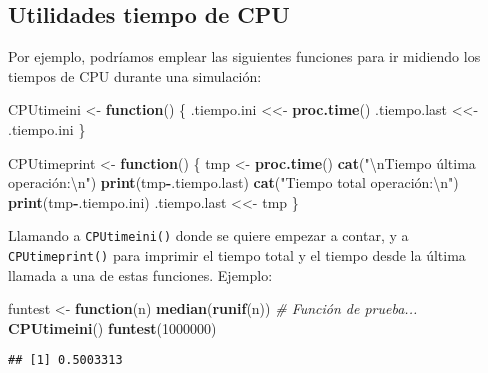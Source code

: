 \documentclass[
]{book}
\newenvironment{Shaded}{\begin{snugshade}}{\end{snugshade}}
\newcommand{\CharTok}[1]{\textcolor[rgb]{0.31,0.60,0.02}{#1}}
\newcommand{\CommentTok}[1]{\textcolor[rgb]{0.56,0.35,0.01}{\textit{#1}}}
\newcommand{\ControlFlowTok}[1]{\textcolor[rgb]{0.13,0.29,0.53}{\textbf{#1}}}
\newcommand{\DecValTok}[1]{\textcolor[rgb]{0.00,0.00,0.81}{#1}}
\newcommand{\KeywordTok}[1]{\textcolor[rgb]{0.13,0.29,0.53}{\textbf{#1}}}
\newcommand{\NormalTok}[1]{#1}
\newcommand{\OperatorTok}[1]{\textcolor[rgb]{0.81,0.36,0.00}{\textbf{#1}}}
\newcommand{\StringTok}[1]{\textcolor[rgb]{0.31,0.60,0.02}{#1}}
\theoremstyle{break}
\theoremstyle{definition}
\theoremstyle{definition}
\theoremstyle{definition}
\theoremstyle{remark}
\begin{document}
\hypertarget{utilidades-tiempo-de-cpu}{%
\subsection{Utilidades tiempo de CPU}\label{utilidades-tiempo-de-cpu}}

Por ejemplo, podríamos emplear las siguientes funciones para
ir midiendo los tiempos de CPU durante una simulación:

\begin{Shaded}
\begin{Highlighting}[]
\NormalTok{CPUtimeini <-}\StringTok{ }\ControlFlowTok{function}\NormalTok{() \{}
\NormalTok{  .tiempo.ini <<-}\StringTok{ }\KeywordTok{proc.time}\NormalTok{()}
\NormalTok{  .tiempo.last <<-}\StringTok{ }\NormalTok{.tiempo.ini}
\NormalTok{\}}

\NormalTok{CPUtimeprint <-}\StringTok{ }\ControlFlowTok{function}\NormalTok{() \{}
\NormalTok{  tmp <-}\StringTok{ }\KeywordTok{proc.time}\NormalTok{()}
  \KeywordTok{cat}\NormalTok{(}\StringTok{"}\CharTok{\textbackslash{}n}\StringTok{Tiempo última operación:}\CharTok{\textbackslash{}n}\StringTok{"}\NormalTok{)}
  \KeywordTok{print}\NormalTok{(tmp}\OperatorTok{-}\NormalTok{.tiempo.last)}
  \KeywordTok{cat}\NormalTok{(}\StringTok{"Tiempo total operación:}\CharTok{\textbackslash{}n}\StringTok{"}\NormalTok{)}
  \KeywordTok{print}\NormalTok{(tmp}\OperatorTok{-}\NormalTok{.tiempo.ini)}
\NormalTok{  .tiempo.last <<-}\StringTok{ }\NormalTok{tmp}
\NormalTok{\}}
\end{Highlighting}
\end{Shaded}

Llamando a \texttt{CPUtimeini()} donde se quiere empezar a contar,
y a \texttt{CPUtimeprint()} para imprimir el tiempo total
y el tiempo desde la última llamada a una de estas funciones.
Ejemplo:

\begin{Shaded}
\begin{Highlighting}[]
\NormalTok{funtest <-}\StringTok{ }\ControlFlowTok{function}\NormalTok{(n) }\KeywordTok{median}\NormalTok{(}\KeywordTok{runif}\NormalTok{(n)) }\CommentTok{# Función de prueba...}
\KeywordTok{CPUtimeini}\NormalTok{()}
\KeywordTok{funtest}\NormalTok{(}\DecValTok{1000000}\NormalTok{)}
\end{Highlighting}
\end{Shaded}

\begin{verbatim}
## [1] 0.5003313
\end{verbatim}
\end{document}
